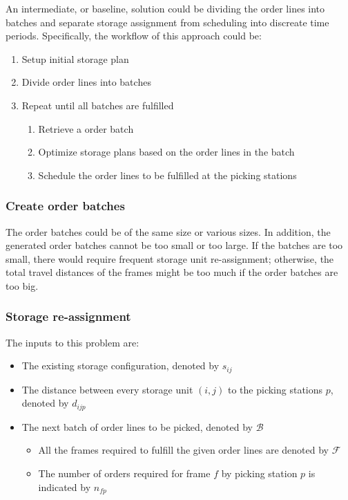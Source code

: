 \documentclass[a4, 11pt]{article}
\begin{document}
An intermediate, or baseline, solution could be dividing the order lines into batches and separate storage assignment from scheduling into discreate time periods.
Specifically, the workflow of this approach could be:

\begin{enumerate}
	\item Setup initial storage plan
	\item Divide order lines into batches
	\item Repeat until all batches are fulfilled
		\begin{enumerate}
			\item Retrieve a order batch
			\item Optimize storage plans based on the order lines in the batch
			\item Schedule the order lines to be fulfilled at the picking stations
		\end{enumerate}
\end{enumerate}



\subsubsection{Create order batches}

The order batches could be of the same size or various sizes.
In addition, the generated order batches cannot be too small or too large.
If the batches are too small, there would require frequent storage unit re-assignment; otherwise, the total travel distances of the frames might be too much if the order batches are too big.

\subsubsection{Storage re-assignment}


The inputs to this problem are:

\begin{itemize}
	\item The existing storage configuration, denoted by $s_{ij}$
	\item The distance between every storage unit $(i, j)$ to the picking stations $p$, denoted by $d_{ijp}$
	\item The next batch of order lines to be picked, denoted by $\mathcal{B}$
		\begin{itemize}
			\item All the frames required to fulfill the given order lines are denoted by $\mathcal{F}$
			\item The number of orders required for frame $f$ by picking station $p$ is indicated by $n_{fp}$
		\end{itemize}
\end{itemize}
\end{document}
